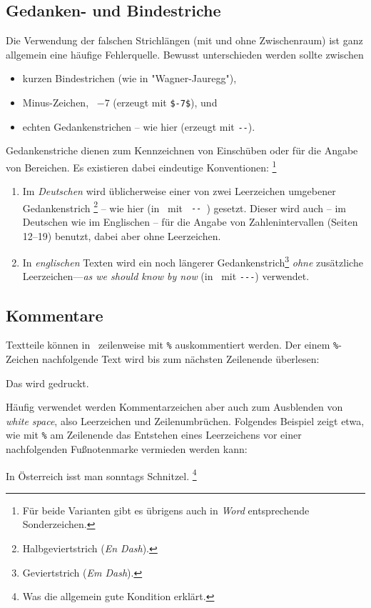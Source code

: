 \subsection{Gedanken- und Bindestriche}
\label{sec:gedankenstrich}

Die Verwendung der falschen Strichlängen (mit und ohne Zwischenraum) ist ganz
allgemein eine häufige Fehlerquelle. Bewusst unterschieden werden sollte
zwischen
%
\begin{itemize}
    \item kurzen Bindestrichen (wie in "Wagner-Jauregg"), %
    \item Minus-Zeichen, \zB\ $-7$ (erzeugt mit \verb!$-7$!), und %
    \item echten Gedankenstrichen -- wie hier (erzeugt mit \verb!--!).
\end{itemize}
%
\noindent
Gedankenstriche dienen zum Kennzeichnen von Einschüben oder für die Angabe von
Bereichen. Es existieren dabei eindeutige Konventionen:%
\footnote{Für beide Varianten gibt es übrigens auch in \emph{Word} entsprechende
Sonderzeichen.}
%
\begin{enumerate}
    \item Im \emph{Deutschen} wird üblicherweise einer von zwei
    Leerzeichen umgebener Gedankenstrich%
    \footnote{Halbgeviertstrich (\emph{En Dash}).} -- wie hier (in \latex\ mit
	{\verb*! -- !}) gesetzt. Dieser wird auch -- im Deutschen wie im Englischen
	-- für die Angabe von Zahlenintervallen (Seiten 12--19) benutzt, dabei aber
	ohne Leerzeichen.
%
    \item In \emph{englischen} Texten wird ein noch längerer
    Gedankenstrich\footnote{Geviertstrich (\emph{Em Dash}).} \emph{ohne}
    zusätzliche Leerzeichen---\emph{as we should know by now}
    (in \latex\ mit {\verb*!---!}) verwendet.
%
\end{enumerate}

\subsection{Kommentare}
\label{sec:kommentare}


Textteile können in \latex\ zeilenweise mit \verb!%! auskommentiert werden.
Der einem \verb!%!-Zeichen nachfolgende Text wird bis zum nächsten
Zeilenende überlesen:
%
\begin{LaTeXCode}[numbers=none]
Das wird gedruckt. %
\end{LaTeXCode}
%
Häufig verwendet werden Kommentarzeichen aber auch zum Ausblenden von
\emph{white space}, also Leerzeichen und Zeilenumbrüchen. Folgendes Beispiel
zeigt etwa, wie mit \verb!%! am Zeilenende das Entstehen eines Leerzeichens
vor einer nachfolgenden Fußnotenmarke vermieden werden kann:
%
\begin{LaTeXCode}[numbers=none]
In Österreich isst man sonntags Schnitzel.%
\footnote{Was die allgemein gute Kondition erklärt.}
\end{LaTeXCode}
%

